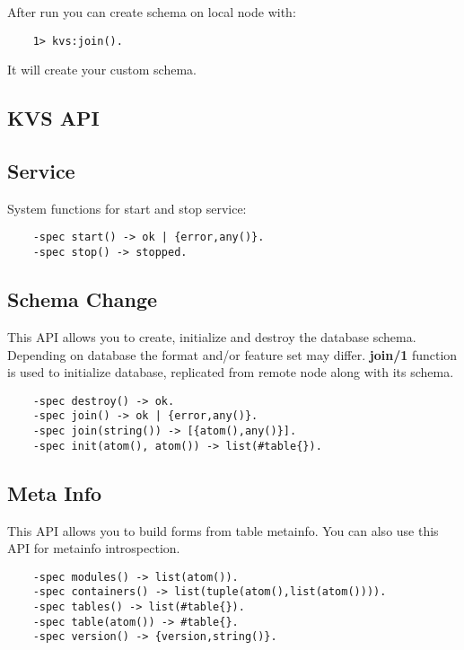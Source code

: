 After run you can create schema on local node with:

\begin{lstlisting}
    1> kvs:join().
\end{lstlisting}

It will create your custom schema.

\subsection{KVS API}

\subsection{Service}
System functions for start and stop service:

\vspace{1\baselineskip}
\begin{lstlisting}
    -spec start() -> ok | {error,any()}.
    -spec stop() -> stopped.
\end{lstlisting}
\vspace{1\baselineskip}

\subsection{Schema Change}
This API allows you to create, initialize and destroy the database schema.
Depending on database the format and/or feature set may differ. {\bf join/1} function
is used to initialize database, replicated from remote node along with its schema.

\vspace{1\baselineskip}
\begin{lstlisting}
    -spec destroy() -> ok.
    -spec join() -> ok | {error,any()}.
    -spec join(string()) -> [{atom(),any()}].
    -spec init(atom(), atom()) -> list(#table{}).
\end{lstlisting}
\vspace{1\baselineskip}

\subsection{Meta Info}
This API allows you to build forms from table metainfo.
You can also use this API for metainfo introspection.

\vspace{1\baselineskip}
\begin{lstlisting}
    -spec modules() -> list(atom()).
    -spec containers() -> list(tuple(atom(),list(atom()))).
    -spec tables() -> list(#table{}).
    -spec table(atom()) -> #table{}.
    -spec version() -> {version,string()}.
\end{lstlisting}
\vspace{1\baselineskip}


